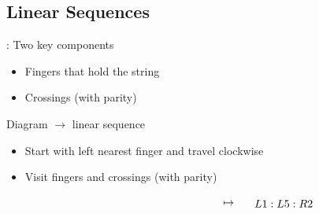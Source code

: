 \subsection{Linear Sequences}
\begin{frame}{\secname: \subsecname}
Two key components
\begin{itemize}[<+(1)->]
    \item Fingers that hold the string
    \item Crossings (with parity)
\end{itemize}

\pause Diagram $\to$ linear sequence

\begin{itemize}[<+(1)->]
    \item Start with left nearest finger and travel clockwise
    \item Visit fingers and crossings (with parity)
\end{itemize}

\def\svgwidth{0.6\columnwidth}
$$\begin{tikzpicture}
    \node at(0,0){};
    \node[shift={(120pt,0)}] at(0,0){$\mapsto$};
    \node[shift={(170pt,0)}] at(0,0){$L1:L5:R2$};
\end{tikzpicture}$$
\end{frame}


